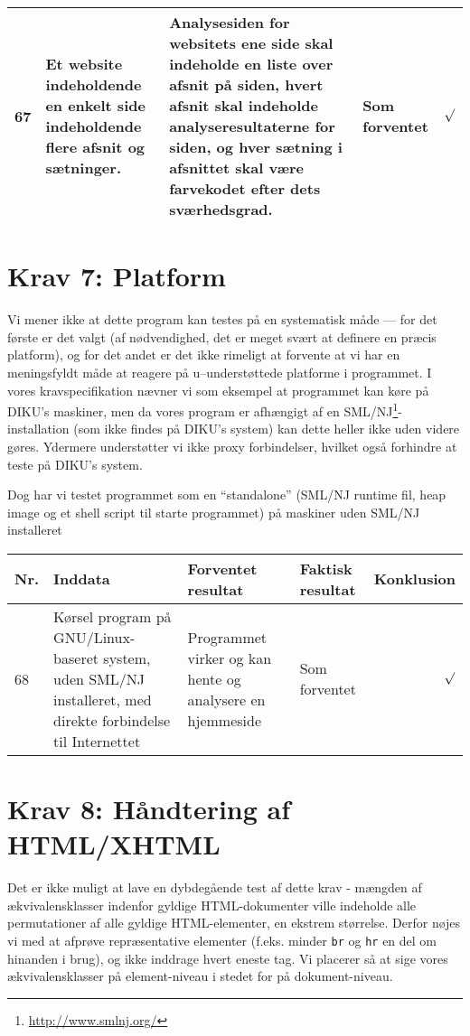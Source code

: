 \documentclass[a4paper,oneside,article]{memoir}
\begin{document}
\begin{landscape}
\begin{longtable}[c]{p{20pt}|p{220pt}|p{130pt}|p{130pt}|p{50pt}}
67 & 
Et website indeholdende en enkelt side indeholdende flere afsnit og
sætninger. &
Analysesiden for websitets ene side skal indeholde en liste over
afsnit på siden, hvert afsnit skal indeholde analyseresultaterne for
siden, og hver sætning i afsnittet skal være farvekodet efter dets
sværhedsgrad. & 
Som forventet & 
$\surd$ \\ \hline

\end{longtable}

\section{Krav 7: Platform}

Vi mener ikke at dette program kan testes på en systematisk måde ---
for det første er det valgt (af nødvendighed, det er meget svært at
definere en præcis platform), og for det andet er det ikke rimeligt at
forvente at vi har en meningsfyldt måde at reagere på u--understøttede
platforme i programmet. I vores kravspecifikation nævner vi som
eksempel at programmet kan køre på DIKU's maskiner, men da vores
program er afhængigt af en
SML/NJ\footnote{\url{http://www.smlnj.org/}}-installation (som ikke
findes på DIKU's system) kan dette heller ikke uden videre gøres.
Ydermere understøtter vi ikke proxy forbindelser, hvilket også forhindre 
at teste på DIKU's system.

Dog har vi testet programmet som en ``standalone'' (SML/NJ runtime fil, heap image og et shell script til starte programmet) på maskiner uden SML/NJ installeret 

\begin{longtable}[c]{p{20pt}|p{220pt}|p{130pt}|p{130pt}|r}
\textbf{Nr.} &
\textbf{Inddata} &
\textbf{Forventet resultat} &
\textbf{Faktisk resultat} &
\textbf{Konklusion} \\ \hline

68 &
Kørsel program på GNU/Linux-baseret system, uden SML/NJ installeret, med direkte forbindelse til
Internettet &
Programmet virker og kan hente og analysere en hjemmeside &
Som forventet &
$\surd$ \\ \hline

\end{longtable}

\section{Krav 8: Håndtering af HTML/XHTML}

Det er ikke muligt at lave en dybdegående test af dette krav - mængden
af ækvivalensklasser indenfor gyldige HTML-dokumenter ville indeholde
alle permutationer af alle gyldige HTML-elementer, en ekstrem
størrelse. Derfor nøjes vi med at afprøve repræsentative elementer
(f.eks. minder \texttt{br} og \texttt{hr} en del om hinanden i brug),
og ikke inddrage hvert eneste tag. Vi placerer så at sige vores
ækvivalensklasser på element-niveau i stedet for på dokument-niveau.


\end{landscape}
\end{document}
